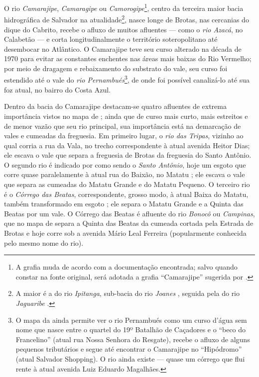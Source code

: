 O rio \textit{Camarajipe}, \textit{Camaragipe} ou \textit{Camorogipe}\footnote{A grafia muda de acordo com a documentação encontrada; salvo quando constar na fonte original, será adotada a grafia ``Camarajipe'' sugerida por .}, centro da terceira maior bacia hidrográfica de Salvador na atualidade\footnote{A maior é a do rio \textit{Ipitanga}, sub-bacia do rio \textit{Joanes} \cite[p.~311]{santos_aguas_2010}, seguida pela do rio \textit{Jaguaribe} \cite[p.~229]{santos_aguas_2010}.}, nasce longe de Brotas, nas cercanias do dique do Cabrito, recebe o afluxo de muitos afluentes --- como o \textit{rio Azacá}, no Calabetão --- e corta longitudinalmente o território soteropolitano até desembocar no Atlântico. O Camarajipe teve seu curso alterado na década de 1970 para evitar as constantes enchentes nas áreas mais baixas do Rio Vermelho; por meio de dragagem e rebaixamento do substrato do vale, seu curso foi estendido até o vale do \textit{rio Pernambués}\footnote{O mapa da  ainda permite ver o rio Pernambués como um curso d'água sem nome que nasce entre o quartel do 19º Batalhão de Caçadores e o ``beco do Francelino'' (atual rua Nossa Senhora do Resgate), recebe o afluxo de alguns pequenos tributários e segue até encontrar o Camarajipe no ``Hipódromo'' (atual Salvador Shopping). O rio ainda existe --- quase um córrego que flui rente à atual avenida Luiz Eduardo Magalhães.}, de onde foi possível canalizá-lo até sua foz atual, no bairro do Costa Azul.

Dentro da bacia do Camarajipe destacam-se quatro afluentes de extrema importância vistos no mapa de ; ainda que de curso mais curto, mais estreitos e de menor vazão que seu rio principal, sua importância está na demarcação de vales e cumeadas da freguesia. Em primeiro lugar, o \textit{rio das Tripas}, vizinho ao qual corria a rua da Vala, no trecho correspondente à atual avenida Heitor Dias; ele escava o vale que separa a freguesia de Brotas da freguesia do Santo Antônio. O segundo rio é indicado por  como sendo o \textit{Santo Antônio}, hoje um esgoto que corre quase paralelamente à atual rua do Baixão, no Matatu \cite[p.~136]{santos_aguas_2010}; ele escava o vale que separa as cumeadas do Matatu Grande e do Matatu Pequeno. O terceiro rio é o \textit{Córrego das Beatas}, correspondente, grosso modo, à atual Baixa do Matatu, também transformado em esgoto \cite[p.~158]{santos_aguas_2010}; ele separa o Matatu Grande e a Quinta das Beatas por um vale. O Córrego das Beatas é afluente do rio \textit{Bonocô} ou \textit{Campinas}, que no mapa de  separa a Quinta das Beatas da cumeada cortada pela Estrada de Brotas e hoje corre sob a avenida Mário Leal Ferreira (popularmente conhecida pelo mesmo nome do rio).

